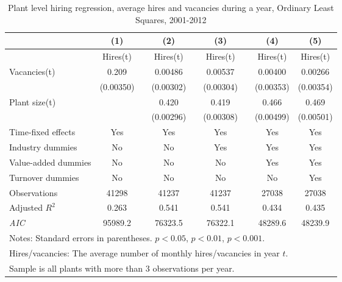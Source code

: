 \begin{table}[htbp]
\caption{\label{tab:robust_year_avg} Plant level hiring regression, average hires and vacancies during a year, Ordinary Least Squares,  2001-2012}
\begin{tabularx} {\textwidth} { l  cXcXcXcc} 
\hline
       &   (1) &&     (2) &&    (3)       &&   (4)        &  (5)      \\
\hline
        &   \footnotesize{Hires(t)} &&     \footnotesize{Hires(t)} &&    \footnotesize{Hires(t)}      &&  \footnotesize{Hires(t)}       &    \footnotesize{Hires(t)}     \\
\hline
Vacancies(t) &      0.209\sym{***}&&     0.00486         &&     0.00537\sym{*} &&     0.00400         &     0.00266          \\
                    &   (0.00350)         &&   (0.00302)         &&  (0.00304)        &&   (0.00353)         &  (0.00354)          \\
Plant size(t)      &     &&                0.420\sym{***} &&       0.419\sym{***} &&       0.466\sym{***} &       0.469\sym{***} \\
                    &                   && (0.00296)         &&   (0.00308)         &&   (0.00499)         &   (0.00501)               \\
\hline
\footnotesize{Time-fixed effects}  & Yes                 && Yes                     &&           Yes          &&    Yes        &    Yes      \\
\footnotesize{Industry dummies}   & No                  && No                      &&     Yes                 &&    Yes        &  Yes      \\
\footnotesize{Value-added dummies} & No                  && No                      &&     No                 &&    Yes        &    Yes      \\
\footnotesize{Turnover dummies }   & No                  && No                      &&     No                 &&    No        &    Yes      \\
\hline
Observations        &    41298         &&       41237         &&       41237         &&       27038         &      27038      \\
Adjusted \(R^{2}\)  &     0.263         &&       0.541         &&       0.541         &&       0.434         &       0.435        \\
\textit{AIC}        &  95989.2         &&     76323.5         &&     76322.1         &&     48289.6         &     48239.9              \\
\hline\hline
\multicolumn{9}{l}{\footnotesize Notes: Standard errors in parentheses. \sym{*} \(p<0.05\), \sym{**} \(p<0.01\), \sym{***} \(p<0.001\).     }\\
\multicolumn{9}{l}{\footnotesize Hires/vacancies: The average number of monthly hires/vacancies in year $t$.}\\
\multicolumn{9}{l}{\footnotesize Sample is all plants with more than 3 observations per year.}\\
\end{tabularx}
\end{table}




